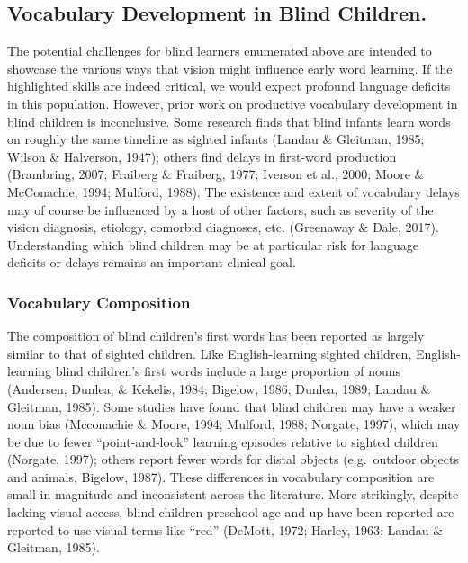 \documentclass[english,man,floatsintext]{apa6}
\begin{document}
\hypertarget{vocabulary-development-in-blind-children.}{%
\subsection{Vocabulary Development in Blind Children.}\label{vocabulary-development-in-blind-children.}}

The potential challenges for blind learners enumerated above are intended to showcase the various ways that vision might influence early word learning. If the highlighted skills are indeed critical, we would expect profound language deficits in this population. However, prior work on productive vocabulary development in blind children is inconclusive. Some research finds that blind infants learn words on roughly the same timeline as sighted infants (Landau \& Gleitman, 1985; Wilson \& Halverson, 1947); others find delays in first-word production (Brambring, 2007; Fraiberg \& Fraiberg, 1977; Iverson et al., 2000; Moore \& McConachie, 1994; Mulford, 1988). The existence and extent of vocabulary delays may of course be influenced by a host of other factors, such as severity of the vision diagnosis, etiology, comorbid diagnoses, etc. (Greenaway \& Dale, 2017). Understanding which blind children may be at particular risk for language deficits or delays remains an important clinical goal.

\hypertarget{vocabulary-composition}{%
\subsubsection{Vocabulary Composition}\label{vocabulary-composition}}

The composition of blind children's first words has been reported as largely similar to that of sighted children. Like English-learning sighted children, English-learning blind children's first words include a large proportion of nouns (Andersen, Dunlea, \& Kekelis, 1984; Bigelow, 1986; Dunlea, 1989; Landau \& Gleitman, 1985). Some studies have found that blind children may have a weaker noun bias (Mcconachie \& Moore, 1994; Mulford, 1988; Norgate, 1997), which may be due to fewer \enquote{point-and-look} learning episodes relative to sighted children (Norgate, 1997); others report fewer words for distal objects (e.g.~outdoor objects and animals, Bigelow, 1987). These differences in vocabulary composition are small in magnitude and inconsistent across the literature. More strikingly, despite lacking visual access, blind children preschool age and up have been reported are reported to use visual terms like \enquote{red} (DeMott, 1972; Harley, 1963; Landau \& Gleitman, 1985).
\end{document}
